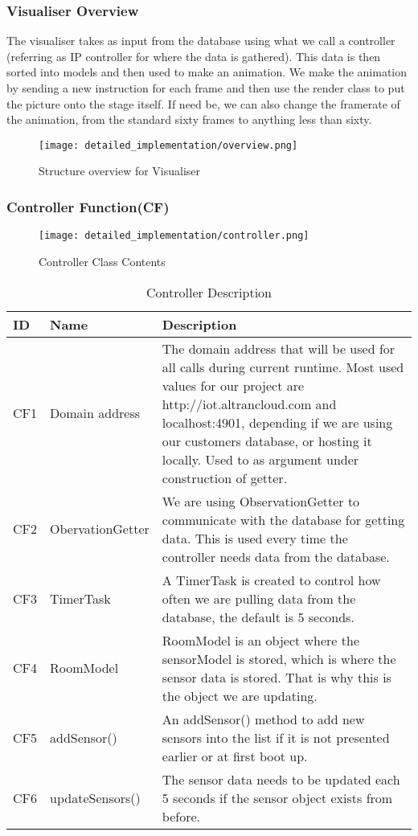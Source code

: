 \documentclass[../document]{subfiles}
\begin{document}
\subsubsection{Visualiser Overview}
The visualiser takes as input from the database using what we call a controller (referring as IP controller for where the data is gathered). This data is then sorted into models and then used to make an animation. We make the animation by sending a new instruction for each frame and then use the render class to put the picture onto the stage itself. If need be, we can also change the framerate of the animation, from the standard sixty frames to anything less than sixty.

\begin{figure}[H]
\centering
\texttt{[image: detailed\_implementation/overview.png]}
\caption{Structure overview for Visualiser}
\end{figure}

\subsubsection{Controller Function(CF)}

\begin{figure}[H]
\centering
\texttt{[image: detailed\_implementation/controller.png]}
\caption{Controller Class Contents}
\end{figure}

\begin{table}[H]
\caption{Controller Description}
\centering
\begin{tabularx}{\textwidth}{|l|l|X|}
	\hline
	ID
	&Name
	&Description
	\\ \hline CF1
	&Domain address
	&The domain address that will be used for all calls during current runtime. Most used values for our project are http://iot.altrancloud.com and localhost:4901, depending if we are using our customers database, or hosting it locally. Used to as argument under construction of getter.
	\\ \hline CF2
	&ObervationGetter
	&We are using ObservationGetter to communicate with the database for getting data. This is used every time the controller needs data from the database.
	\\ \hline CF3
	&TimerTask
	&A TimerTask is created to control how often we are pulling data from the database, the default is 5 seconds.
	\\ \hline CF4
	&RoomModel
	&RoomModel is an object where the sensorModel is stored, which is where the sensor data is stored. That is why this is the object we are updating. 
	\\ \hline CF5
	&addSensor()
	&An addSensor() method to add new sensors into the list if it is not presented earlier or at first boot up.
	\\ \hline CF6
	&updateSensors()
	&The sensor data needs to be updated each 5 seconds if the sensor object exists from before.
	\\ \hline 
\end{tabularx}
\end{table}
\end{document}
